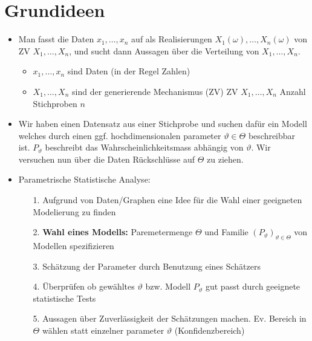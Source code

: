 
\section{Grundideen}
\begin{itemize}
    \item Man fasst die Daten $x_1, \dots, x_n$ auf als Realisierungen $X_1(\omega), \dots, X_n(\omega)$ von ZV $X_1, \dots, X_n$, und sucht dann Aussagen über die Verteilung von $X_1, \dots, X_n$.
        \begin{itemize}
            \item $x_1, \dots, x_n$ sind Daten (in der Regel Zahlen)
            \item $X_1, \dots, X_n$ sind der generierende Mechanismus (ZV)
             ZV $X_1, \dots, X_n$
             Anzahl Stichproben $n$
        \end{itemize}
    \item Wir haben einen Datensatz aus einer Stichprobe und suchen dafür ein Modell welches durch einen ggf. hochdimensionalen parameter $\vartheta \in \Theta$ beschreibbar ist. $P_\vartheta$ beschreibt das Wahrscheinlichkeitsmass abhängig von $\vartheta$. Wir versuchen nun über die Daten Rückschlüsse auf $\Theta$ zu ziehen.
    \item Parametrische Statistische Analyse:
        \begin{itemize}
            \item[1.] Aufgrund von Daten/Graphen eine Idee für die Wahl einer geeigneten Modelierung zu finden
            \item[2.] \textbf{Wahl eines Modells:} Paremetermenge $\Theta$ und Familie $(P_\vartheta)_{\vartheta \in \Theta}$ von Modellen spezifizieren
            \item[3.] Schätzung der Parameter durch Benutzung eines Schätzers
            \item[4.] Überprüfen ob gewähltes $\vartheta$ bzw. Modell $P_\vartheta$ gut passt durch geeignete statistische Tests
            \item[5.] Aussagen über Zuverlässigkeit der Schätzungen machen. Ev. Bereich in $\Theta$ wählen statt einzelner parameter $\vartheta$ (Konfidenzbereich)
        \end{itemize}
\end{itemize}
